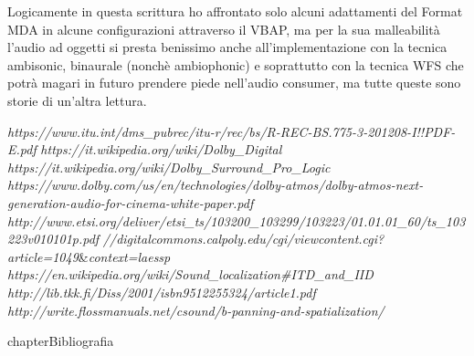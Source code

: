 \documentclass[12pt,a4paper]{report}
\begin{document}
Logicamente in questa scrittura ho affrontato solo alcuni adattamenti del Format MDA in alcune configurazioni attraverso il VBAP, ma per la sua malleabilità l'audio ad oggetti si presta benissimo anche all'implementazione con la tecnica ambisonic, binaurale (nonchè ambiophonic) e soprattutto con la tecnica WFS che potrà magari in futuro prendere piede nell'audio consumer, ma tutte queste sono storie di un'altra lettura.




\begin{thebibliography}{}

 \textit{https://www.itu.int/dms\_pubrec/itu-r/rec/bs/R-REC-BS.775-3-201208-I!!PDF-E.pdf}
 \textit{https://it.wikipedia.org/wiki/Dolby\_Digital}
 \textit{https://it.wikipedia.org/wiki/Dolby\_Surround\_Pro\_Logic}
 \textit{https://www.dolby.com/us/en/technologies/dolby-atmos/dolby-atmos-next-generation-audio-for-cinema-white-paper.pdf}
\textit{http://www.etsi.org/deliver/etsi\_ts/103200\_103299/103223/01.01.01\_60/ts\_103223v010101p.pdf}
\textit{//digitalcommons.calpoly.edu/cgi/viewcontent.cgi?article=1049}\&\textit{context=laessp}
 \textit{https://en.wikipedia.org/wiki/Sound\_localization\#ITD\_and\_IID}
 \textit{http://lib.tkk.fi/Diss/2001/isbn9512255324/article1.pdf}
 \textit{http://write.flossmanuals.net/csound/b-panning-and-spatialization/}
\end{thebibliography}
 {chapter}{Bibliografia}
\end{document}
